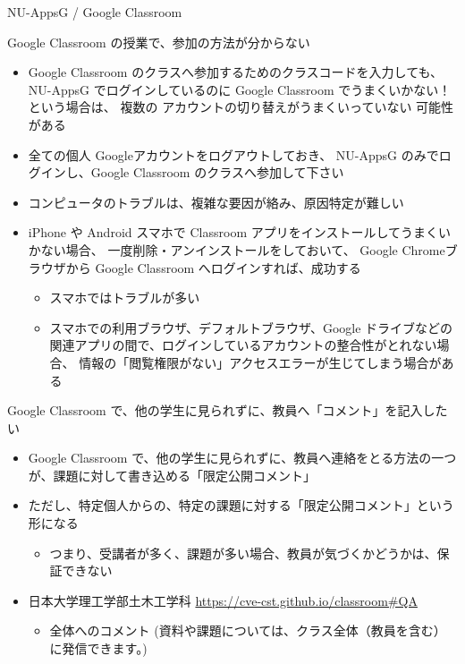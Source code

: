 \documentclass[a4j,10pt]{jsarticle}
\begin{document}
{\begin{frame}[label={sec:org25495ab},fragile]{NU-AppsG / Google Classroom}
\begin{block}{Google Classroom の授業で、参加の方法が分からない}
\begin{itemize}
\par
\item Google Classroom のクラスへ参加するためのクラスコードを入力しても、
NU-AppsG でログインしているのに Google Classroom でうまくいかない！という場合は、
複数の \alert{アカウントの切り替えがうまくいっていない} 可能性がある
\par
\item 全ての個人 Googleアカウントをログアウトしておき、
NU-AppsG のみでログインし、Google Classroom のクラスへ参加して下さい
\par
\item コンピュータのトラブルは、複雑な要因が絡み、原因特定が難しい
\par
\item iPhone や Android スマホで Classroom アプリをインストールしてうまくいかない場合、
一度削除・アンインストールをしておいて、
Google Chromeブラウザから Google Classroom へログインすれば、成功する
\begin{itemize}
\item スマホではトラブルが多い
\item スマホでの利用ブラウザ、デフォルトブラウザ、Google ドライブなどの関連アプリの間で、ログインしているアカウントの整合性がとれない場合、
情報の「閲覧権限がない」アクセスエラーが生じてしまう場合がある
\end{itemize}
\end{itemize}
\end{block}
\par
\begin{block}{Google Classroom で、他の学生に見られずに、教員へ「コメント」を記入したい}
\begin{itemize}
\item Google Classroom で、他の学生に見られずに、教員へ連絡をとる方法の一つが、課題に対して書き込める「限定公開コメント」
\par
\item ただし、特定個人からの、特定の課題に対する「限定公開コメント」という形になる
\begin{itemize}
\item つまり、受講者が多く、課題が多い場合、教員が気づくかどうかは、保証できない
\end{itemize}
\par
\item 日本大学理工学部土木工学科 \url{https://cve-cst.github.io/classroom\#QA}
\begin{itemize}
\item 全体へのコメント (資料や課題については、クラス全体（教員を含む）に発信できます。)

\end{itemize}
\end{itemize}
\end{block}
\end{frame}}
\end{document}
